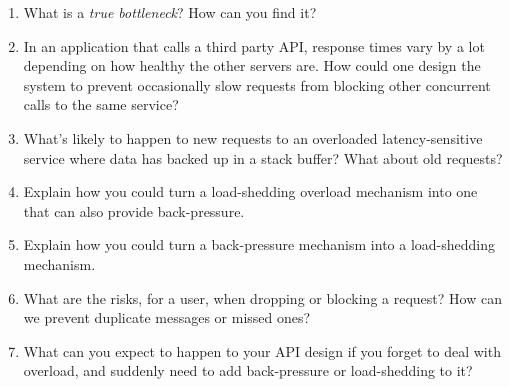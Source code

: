\begin{enumerate}
	\item What is a \emph{true bottleneck}? How can you find it?
	\item In an application that calls a third party API, response times vary by a lot depending on how healthy the other servers are. How could one design the system to prevent occasionally slow requests from blocking other concurrent calls to the same service?
	\item What's likely to happen to new requests to an overloaded latency-sensitive service where data has backed up in a stack buffer? What about old requests?
	\item Explain how you could turn a load-shedding overload mechanism into one that can also provide back-pressure.
	\item Explain how you could turn a back-pressure mechanism into a load-shedding mechanism.
	\item What are the risks, for a user, when dropping or blocking a request? How can we prevent duplicate messages or missed ones?
	\item What can you expect to happen to your API design if you forget to deal with overload, and suddenly need to add back-pressure or load-shedding to it?
\end{enumerate}
